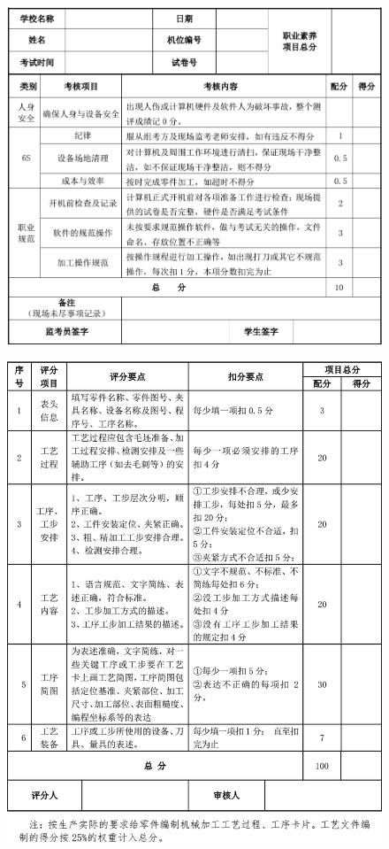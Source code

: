 \begin{figure}
	\centering
	\includegraphics[width=0.9\linewidth]{images/1-3}
	\caption{}
	\label{fig:1-1}
\end{figure}
\begin{figure}
	\centering
	\includegraphics[width=0.9\linewidth]{images/1-4}
	\caption{}
	\label{fig:1-1}
\end{figure}
